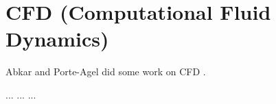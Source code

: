 \chapter{CFD (Computational Fluid Dynamics)} \label{sec:CFD}

Abkar and Porte-Agel did some work on CFD \cite{Abkar2015}.

...
...
...

